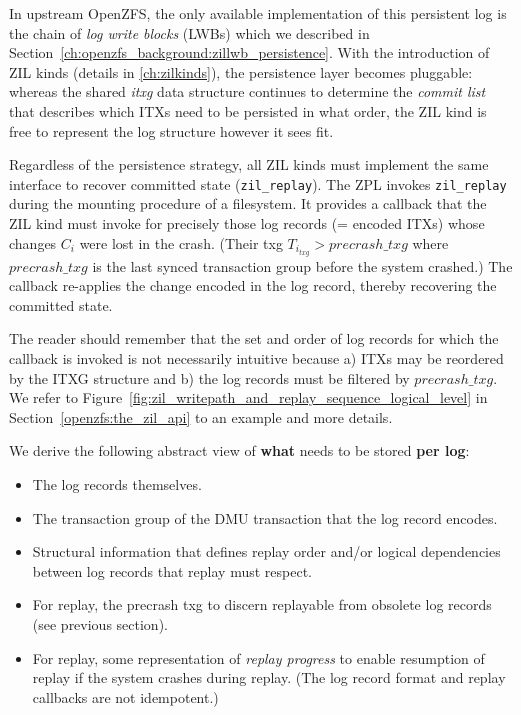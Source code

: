 \documentclass[12pt,a4paper,twoside]{book}
\begin{document}
In upstream OpenZFS, the only available implementation of this persistent log is the chain of \textit{log write blocks} (LWBs) which we described in Section~\ref{ch:openzfs_background:zillwb_persistence}.
With the introduction of ZIL kinds (details in \ref{ch:zilkinds}), the persistence layer becomes pluggable:
whereas the shared \textit{itxg} data structure continues to determine the \textit{commit list} that describes which ITXs need to be persisted in what order, the ZIL kind is free to represent the log structure however it sees fit.

Regardless of the persistence strategy, all ZIL kinds must implement the same interface to recover committed state (\lstinline{zil_replay}).
The ZPL invokes \lstinline{zil_replay} during the mounting procedure of a filesystem.
It provides a callback that the ZIL kind must invoke for precisely those log records (= encoded ITXs) whose changes $C_i$ were lost in the crash.
(Their txg $T_{i_{txg}} > precrash\_txg$ where $precrash\_txg$ is the last synced transaction group before the system crashed.)
The callback re-applies the change encoded in the log record, thereby recovering the committed state.

The reader should remember that the set and order of log records for which the callback is invoked is not necessarily intuitive because
a) ITXs may be reordered by the ITXG structure and b) the log records must be filtered by $precrash\_txg$.
We refer to Figure~\ref{fig:zil_writepath_and_replay_sequence_logical_level} in Section~\ref{openzfs:the_zil_api} to an example and more details.


We derive the following abstract view of \textbf{what} needs to be stored \textbf{per log}:
\begin{itemize}[noitemsep,beginpenalty=100000,midpenalty=100000]
    \item The log records themselves.
    \item The transaction group of the DMU transaction that the log record encodes.
    \item Structural information that defines replay order and/or logical dependencies between log records that replay must respect.
    \item For replay, the precrash txg to discern replayable from obsolete log records (see previous section).
    \item For replay, some representation of \textit{replay progress} to enable resumption of replay if the system crashes during replay.
        (The log record format and replay callbacks are not idempotent.)
\end{itemize}
\end{document}
